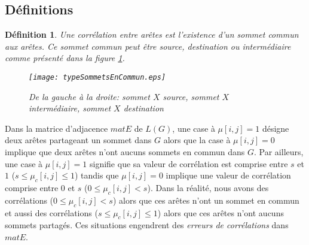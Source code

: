 \documentclass[onecolumn, 12pt]{book}
\newtheorem{definition}{D\'efinition}
\begin{document}
\subsection{D\'efinitions}

\begin{definition}
Une corr\'elation entre ar\^etes est l'existence d'un sommet commun aux ar\^etes. 
Ce sommet commun peut \^etre source, destination ou interm\'ediaire comme pr\'esent\'e dans la figure \ref{typeSommetEnCommun}.
\begin{figure}[htb!] 
\centering
\texttt{[image: typeSommetsEnCommun.eps]}
\caption{De la gauche \`a la droite: sommet $X$ source, sommet $X$ interm\'ediaire, sommet $X$ destination}
\label{typeSommetEnCommun} 
\end{figure}

\end{definition}
Dans la matrice d'adjacence $matE$ de $L(G)$, une case \`a $\mu[i,j] = 1$ d\'esigne deux ar\^etes partageant un sommet dans $G$ alors que la case \`a $\mu[i,j] = 0$ implique que deux ar\^etes n'ont aucuns sommets en commun dans $G$. 
\newline
Par ailleurs, une case \`a $\mu[i,j] = 1$ signifie que sa valeur de corr\'elation  est comprise entre $s$ et $1$ ($s \le \mu_c[i,j] \le 1$) tandis que $\mu[i,j] = 0$ implique une valeur de corr\'elation comprise entre $0$ et $s$ ($0 \le \mu_c[i,j] < s$). 
Dans la r\'ealit\'e, nous avons des corr\'elations ($0 \le \mu_c[i,j] < s$) alors que ces ar\^etes n'ont un sommet en commun et aussi des corr\'elations  ($s \le \mu_c[i,j] \le 1$) alors que ces ar\^etes n'ont aucuns sommets partag\'es. Ces situations engendrent des {\em erreurs de corr\'elations} dans $matE$.
\end{document}

